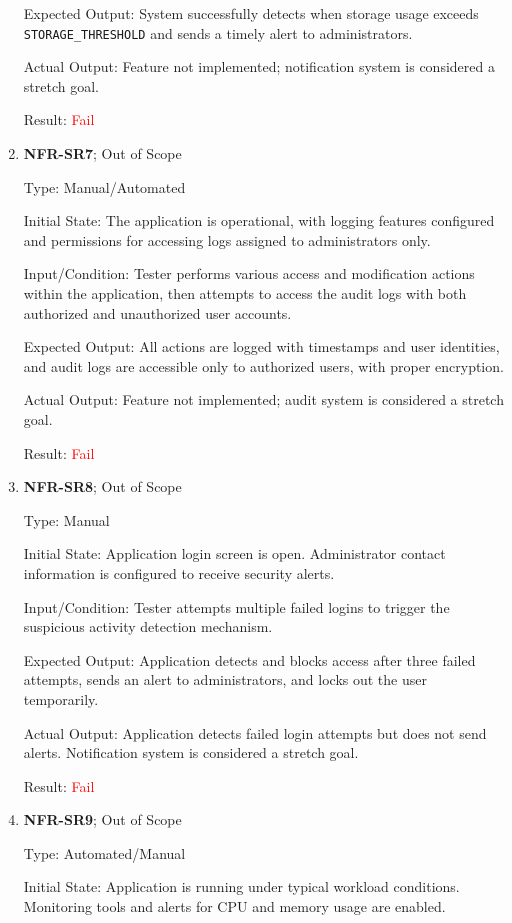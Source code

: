 \documentclass[12pt, titlepage]{article}
\begin{document}
\begin{enumerate}
Expected Output: System successfully detects when storage usage exceeds
\texttt{STORAGE\_THRESHOLD} and sends a timely alert to administrators.

Actual Output: Feature not implemented; notification system is considered a
stretch goal.

Result: \textcolor{red}{Fail}

\item{\textbf{NFR-SR7}}; Out of Scope \label{NFR:SR7}

Type: Manual/Automated

Initial State: The application is operational, with logging features configured
and permissions for accessing logs assigned to administrators only.

Input/Condition: Tester performs various access and modification actions within
the application, then attempts to access the audit logs with both authorized and
unauthorized user accounts.
  
Expected Output: All actions are logged with timestamps and user identities, and
audit logs are accessible only to authorized users, with proper encryption.

Actual Output: Feature not implemented; audit system is considered a stretch
goal.

Result: \textcolor{red}{Fail}

\item{\textbf{NFR-SR8}}; Out of Scope \label{NFR:SR8}

Type: Manual

Initial State: Application login screen is open. Administrator contact
information is configured to receive security alerts.

Input/Condition: Tester attempts multiple failed logins to trigger the
suspicious activity detection mechanism.

Expected Output:  Application detects and blocks access after three failed
attempts, sends an alert to administrators, and locks out the user temporarily.

Actual Output: Application detects failed login attempts but does not send
alerts. Notification system is considered a stretch goal.

Result: \textcolor{red}{Fail}

\item{\textbf{NFR-SR9}}; Out of Scope \label{NFR:SR9}

Type: Automated/Manual

Initial State: Application is running under typical workload conditions.
Monitoring tools and alerts for CPU and memory usage are enabled.


\end{enumerate}
\end{document}
